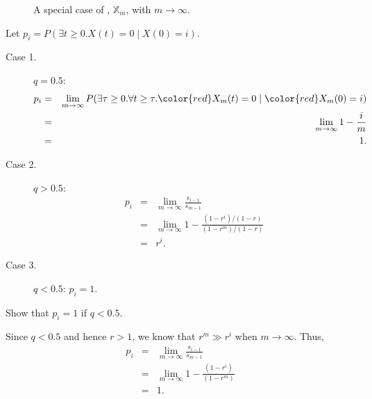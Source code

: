 \begin{figure}[htp]
\centering
{}

A special case of , $ \mathbb{X}_{m} $, with $ m \to \infty $.
\end{figure}

\noindent Let $ p_{i} = P(\exists t \ge 0. X(t) = 0 \mid X(0) = i) $.
\begin{description}
  \item[Case 1.] $ q = 0.5 $:
    \begin{eqnarray*}
    p_{i}
      & = & \lim_{m \to \infty} P(\exists \tau \ge 0. \forall t \ge \tau. {\color{red} X_{m}}(t) = 0 \mid {\color{red} X_{m}}(0) = i) \\
      & = & \lim_{m \to \infty} 1 - \frac{i}{m} \\
      & = & 1.
    \end{eqnarray*}
  \item[Case 2.] $ q > 0.5 $:
    \begin{eqnarray*}
    p_{i}
      & = & \lim_{m \to \infty} \frac{s_{i - 1}}{s_{m - 1}} \\
      & = & \lim_{m \to \infty} 1 - \frac{(1 - r^{i}) / (1 - r)}{(1 - r^{m}) / (1 - r)} \\
      & = & r^{i}.
    \end{eqnarray*}
  \item[Case 3.] $ q < 0.5 $: $ p_{i} = 1 $.
\end{description}

\begin{exercise}
Show that $ p_{i} = 1 $ if $ q < 0.5 $.

\begin{solution}
Since $ q < 0.5 $ and hence $ r > 1 $, we know that $ r^{m} \gg r^{i} $ when $ m \to \infty $. Thus,
\begin{eqnarray*}
p_{i}
  & = & \lim_{m \to \infty} \frac{s_{i - 1}}{s_{m - 1}} \\
  & = & \lim_{m \to \infty} 1 - \frac{(1 - r^{i})}{(1 - r^{m})} \\
  & = & 1.
\end{eqnarray*}
\end{solution}
\end{exercise}

